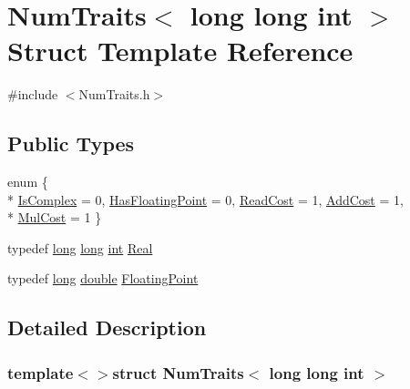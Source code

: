 \hypertarget{struct_num_traits_3_01long_01long_01int_01_4}{\section{Num\-Traits$<$ long long int $>$ Struct Template Reference}
\label{struct_num_traits_3_01long_01long_01int_01_4}
}


{\ttfamily \#include $<$Num\-Traits.\-h$>$}

\subsection*{Public Types}
\begin{DoxyCompactItemize}
\item 
enum \{ \\*
\hyperlink{struct_num_traits_3_01long_01long_01int_01_4_a1c11d0a64a908327399ab65734320988a353ee110585deb7cf25645b76cf09f29}{Is\-Complex} = 0, 
\hyperlink{struct_num_traits_3_01long_01long_01int_01_4_a1c11d0a64a908327399ab65734320988a88d05938ac41bc891c31a389faf7e35c}{Has\-Floating\-Point} = 0, 
\hyperlink{struct_num_traits_3_01long_01long_01int_01_4_a1c11d0a64a908327399ab65734320988ac8f0632efac6a4d16066b9110560b440}{Read\-Cost} = 1, 
\hyperlink{struct_num_traits_3_01long_01long_01int_01_4_a1c11d0a64a908327399ab65734320988a619f02851a8a744efbba7695653f2e53}{Add\-Cost} = 1, 
\\*
\hyperlink{struct_num_traits_3_01long_01long_01int_01_4_a1c11d0a64a908327399ab65734320988a2c88aa8aac8fb160dda0d2d16922bf2a}{Mul\-Cost} = 1
 \}
\item 
typedef \hyperlink{ioapi_8h_a3c7b35ad9dab18b8310343c201f7b27e}{long} \hyperlink{ioapi_8h_a3c7b35ad9dab18b8310343c201f7b27e}{long} \hyperlink{ioapi_8h_a787fa3cf048117ba7123753c1e74fcd6}{int} \hyperlink{struct_num_traits_3_01long_01long_01int_01_4_a499098f0bd884cf47d38c364a0f11e36}{Real}
\item 
typedef \hyperlink{ioapi_8h_a3c7b35ad9dab18b8310343c201f7b27e}{long} \hyperlink{_super_l_u_support_8h_a8956b2b9f49bf918deed98379d159ca7}{double} \hyperlink{struct_num_traits_3_01long_01long_01int_01_4_a314101669aef44a808c642110036d7f7}{Floating\-Point}
\end{DoxyCompactItemize}


\subsection{Detailed Description}
\subsubsection*{template$<$$>$struct Num\-Traits$<$ long long int $>$}



